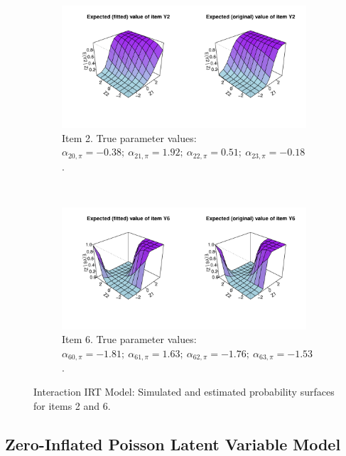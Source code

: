 \documentclass[11pt, a4paper]{article}
\begin{document}
\begin{figure}
\centering
\begin{subfigure}[b]{0.9\textwidth}
    \includegraphics[width=\textwidth, trim = 0cm 2cm 2cm 0cm]{n1000_BernInt_item2.pdf}
    \caption{Item 2. True parameter values: $\alpha_{20,\pi} = -0.38;~\alpha_{21,\pi} = 1.92;~ \alpha_{22,\pi} = 0.51;~\alpha_{23,\pi} = -0.18$.}
    \label{fig:Sim2item2}
\end{subfigure}
\\ %
\begin{subfigure}[b]{0.9\textwidth}
    \includegraphics[width=\textwidth, trim = 0cm 2cm 2cm 0cm]{n1000_BernInt_item6.pdf}
    \caption{Item 6. True parameter values: $\alpha_{60,\pi} = -1.81;~\alpha_{61,\pi} = 1.63;~ \alpha_{62,\pi} = -1.76;~\alpha_{63,\pi} = -1.53$.}
    \label{fig:Sim2item6}
\end{subfigure}
\caption{Interaction IRT Model: Simulated and estimated probability surfaces for items 2 and 6.}\label{fig:Sim2}
\end{figure}

\subsection{Zero-Inflated Poisson Latent Variable Model}
\end{document}
